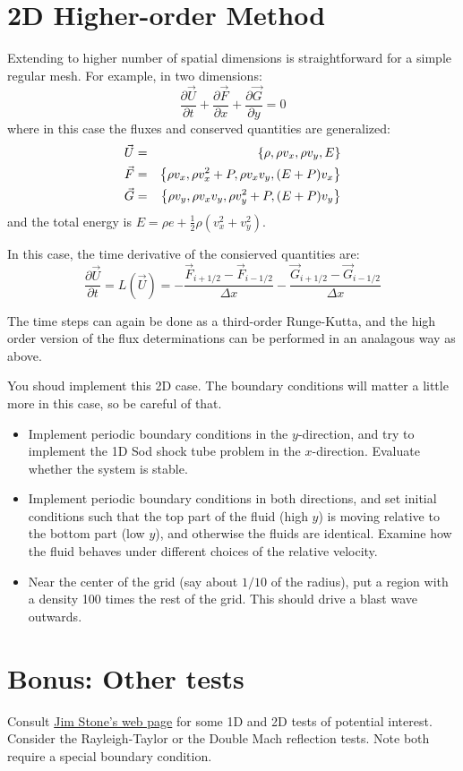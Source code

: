 \documentclass[11pt, preprint]{aastex}
\begin{document}
\section{2D Higher-order Method}

Extending to higher number of spatial dimensions is straightforward
for a simple regular mesh. For example, in two dimensions:
\begin{equation}
\label{eq:conservation}
  \frac{\partial \vec{U}}{\partial t}
  + \frac{\partial \vec{F}}{\partial x}
  + \frac{\partial \vec{G}}{\partial y} = 0
\end{equation}
where in this case the fluxes and conserved quantities are
generalized:
\begin{eqnarray}
\vec{U} &=& \left\{\rho, \rho v_x, \rho v_y, E\right\} \cr
\vec{F} &=& \left\{\rho v_x, \rho v_x^2 + P, \rho v_x v_y, (E+P) v_x\right\} \cr
\vec{G} &=& \left\{\rho v_y, \rho v_x v_y, \rho v_y^2 + P, (E+P) v_y\right\}
\end{eqnarray}
and the total energy is $E=\rho e + \frac{1}{2}\rho(v_x^2 + v_y^2)$.

In this case, the time derivative of the consierved quantities are:
\begin{equation}
  \frac{\partial \vec{U}}{\partial t} = L\left(\vec{U}\right)
  = - \frac{\vec{F}_{i+1/2} - \vec{F}_{i-1/2}}{\Delta x}
    - \frac{\vec{G}_{i+1/2} - \vec{G}_{i-1/2}}{\Delta x}
\end{equation}

The time steps can again be done as a third-order Runge-Kutta, and the
high order version of the flux determinations can be performed in an
analagous way as above.

You shoud implement this 2D case. The boundary conditions will matter
a little more in this case, so be careful of that.

\begin{itemize}
\item Implement periodic boundary conditions in the $y$-direction, and
  try to implement the 1D Sod shock tube problem in the
  $x$-direction. Evaluate whether the system is stable.
\item Implement periodic boundary conditions in both directions, and
  set initial conditions such that the top part of the fluid (high
  $y$) is moving relative to the bottom part (low $y$), and otherwise
  the fluids are identical. Examine how the fluid behaves under
  different choices of the relative velocity.
\item Near the center of the grid (say about $1/10$ of the radius),
  put a region with a density 100 times the rest of the grid. This
  should drive a blast wave outwards.
\end{itemize}

\section{Bonus: Other tests}

Consult
\href{https://www.astro.princeton.edu/~jstone/Athena/tests}{Jim
  Stone's web page} for some 1D and 2D tests of potential
interest. Consider the Rayleigh-Taylor or the Double Mach reflection
tests. Note both require a special boundary condition. 
\end{document}
